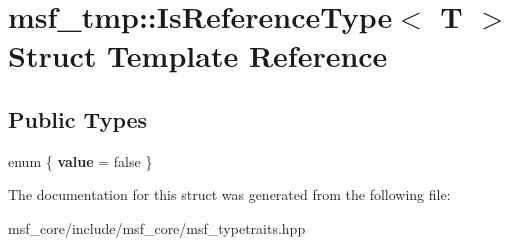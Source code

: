 \hypertarget{structmsf__tmp_1_1IsReferenceType}{\section{msf\-\_\-tmp\-:\-:Is\-Reference\-Type$<$ T $>$ Struct Template Reference}
\label{structmsf__tmp_1_1IsReferenceType}
}
\subsection*{Public Types}
\begin{DoxyCompactItemize}
\item 
enum \{ {\bfseries value} =  false
 \}
\end{DoxyCompactItemize}


The documentation for this struct was generated from the following file\-:\begin{DoxyCompactItemize}
\item 
msf\-\_\-core/include/msf\-\_\-core/msf\-\_\-typetraits.\-hpp\end{DoxyCompactItemize}
